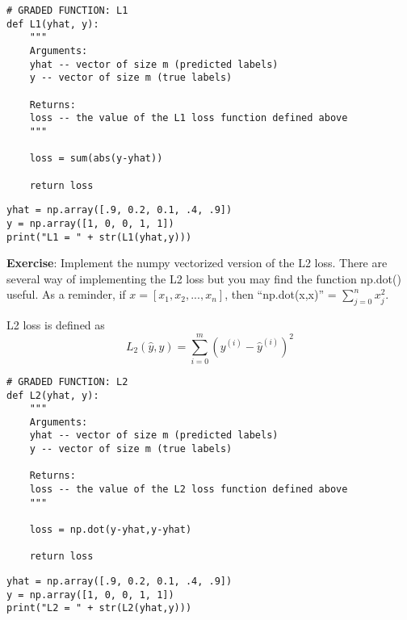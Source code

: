 \begin{verbatim} 
# GRADED FUNCTION: L1
def L1(yhat, y):
    """
    Arguments:
    yhat -- vector of size m (predicted labels)
    y -- vector of size m (true labels)
    
    Returns:
    loss -- the value of the L1 loss function defined above
    """
    
    loss = sum(abs(y-yhat))
    
    return loss
\end{verbatim} 

\begin{verbatim} 
yhat = np.array([.9, 0.2, 0.1, .4, .9])
y = np.array([1, 0, 0, 1, 1])
print("L1 = " + str(L1(yhat,y))) 
\end{verbatim}  

{\textbf {Exercise}}: Implement the numpy vectorized version of the L2 loss. There are several way of implementing the L2 loss but you may find the function np.dot() useful. As a reminder, if $x = [x_1, x_2, ..., x_n]$, then ``np.dot(x,x)'' = $\sum_{j=0}^n x_j^{2}$. 

L2 loss is defined as 
\begin{equation}
L_2(\hat{y},y) = \sum_{i=0}^m(y^{(i)} - \hat{y}^{(i)})^2 
\end{equation}



\begin{verbatim} 
# GRADED FUNCTION: L2
def L2(yhat, y):
    """
    Arguments:
    yhat -- vector of size m (predicted labels)
    y -- vector of size m (true labels)
    
    Returns:
    loss -- the value of the L2 loss function defined above
    """

    loss = np.dot(y-yhat,y-yhat)
    
    return loss
\end{verbatim}  
\vspace{-0.5cm}
\begin{verbatim} 
yhat = np.array([.9, 0.2, 0.1, .4, .9])
y = np.array([1, 0, 0, 1, 1])
print("L2 = " + str(L2(yhat,y)))
\end{verbatim}  



\clearpage

